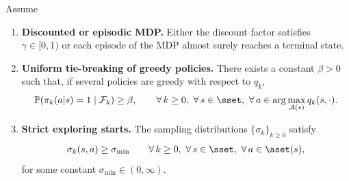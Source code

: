\documentclass{article}
\begin{document}
\begin{theorem}
\label{thm: iv mcopi with 1/g scaling}
Assume
\begin{enumerate}[label=(\arabic*)]
    \item \textbf{Discounted or episodic MDP.}
    Either the discount factor satisfies $\gamma \in [0, 1)$ or each episode of the MDP almost surely reaches a terminal state.

    \item \textbf{Uniform tie-breaking of greedy policies.}
    There exists a constant \(\beta>0\) such that,
    if several policies are greedy with respect to $q_k$,
    \begin{equation}
    \label{eq:greedy-pol-tie-breaking}
    \mathbb P(\pi_k(a | s) = 1 \mid \mathcal F_k)\ge \beta,
        \qquad 
        \forall \, k \ge 0, \
        \forall \, s \in \sset, \
        \forall \, a \in \arg\max_{\mathcal A(s)} q_k(s,\cdot) .
    \end{equation}

    \item \textbf{Strict exploring starts.}
    The sampling distributions $\{\sigma_k\}_{k \ge 0}$ satisfy
    \begin{align}
    \label{eq: strict exploring starts}
        \sigma_k(s,a) \ge \sigma_{\min}
        \qquad 
        \forall \, k \ge 0, \
        \forall \, s \in \sset, \
        \forall \, a \in \aset(s) ,
    \end{align}
    for some constant $\sigma_{\min} \in (0,\infty)$.



\end{enumerate}
\end{theorem}
\end{document}
